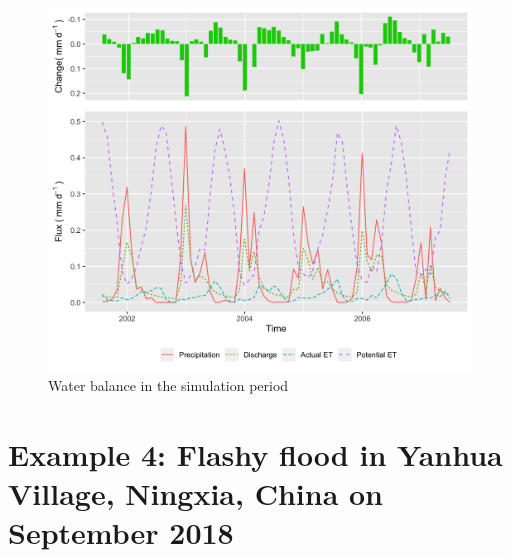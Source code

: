 \documentclass[
]{scrbook}
\begin{document}
\begin{figure}
\centering
\includegraphics{Fig/Example/CacheCreek/sac5_wb.png}
\caption{Water balance in the simulation period}
\end{figure}

\hypertarget{example-4-flashy-flood-in-yanhua-village-ningxia-china-on-september-2018}{%
\section{Example 4: Flashy flood in Yanhua Village, Ningxia, China on September 2018}\label{example-4-flashy-flood-in-yanhua-village-ningxia-china-on-september-2018}}
\end{document}
